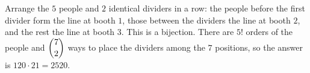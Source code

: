 Arrange the $5$ people and $2$ identical dividers in a row: the people before the first divider form the line at booth $1$, those between the dividers the line at booth $2$, and the rest the line at booth $3$. This is a bijection. There are $5!$ orders of the people and $\dbinom72$ ways to place the dividers among the $7$ positions, so the answer is $120\cdot21=\boxed{2520}$.
